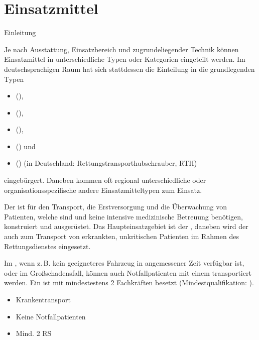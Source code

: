 \clearpage
\section{Einsatzmittel}
\label{topic:einsatzmittel}

\Text
{Einleitung}%
{%
Je nach Ausstattung, Einsatzbereich und zugrundeliegender Technik können Einsatzmittel in unterschiedliche Typen oder Kategorien eingeteilt werden. 
%
%
Im deutschsprachigen Raum hat sich stattdessen die Einteilung in die grundlegenden Typen 
\begin{itemize}
  \item {} (), 
  \item {}
(), 
\item {} (), 
\item {}
() und 
\item {} () (in Deutschland:
Rettungstransporthubschrauber, RTH) 
\end{itemize}
eingebürgert. 
%
Daneben kommen oft regional unterschiedliche 
oder organisationsspezifische
andere Einsatzmitteltypen zum Einsatz.
}%


{%
%
%
Der  ist für den Transport, die Erstversorgung und
die Überwachung von Patienten, welche  sind und keine intensive medizinische
Betreuung benötigen, konstruiert und ausgerüstet.
Das Haupteinsatzgebiet ist der , daneben
wird der  auch zum Transport von erkrankten,
unkritischen Patienten im Rahmen des Rettungsdienstes
eingesetzt.

Im , wenn z.\,B. kein geeigneteres Fahrzeug
in angemessener Zeit verfügbar ist, oder im Großschadensfall,
können auch Notfallpatienten mit einem 
transportiert werden.
Ein  ist mit mindestestens 2 Fachkräften besetzt
(Mindestqualifikation: ).


}{
\begin{itemize}
  \item Krankentransport
  \item Keine Notfallpatienten
  \item Mind. 2 RS
\end{itemize}
}

